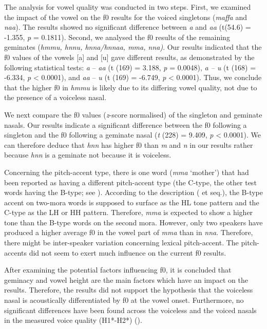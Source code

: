 \documentclass[output=paper]{langscibook}
\begin{document}
The analysis for vowel quality was conducted in two steps. First, we examined the impact of the vowel on the f0 results for the voiced singletons (\textit{maffa} and \textit{naa}). The results showed no significant difference between \textit{a} and \textit{aa} (t(54.6) = -1.355, \textit{p} = 0.1811). Second, we analysed the f0 results of the remaining geminates (\textit{hmmu, hnnu, hnna/hnnaa, mma, nna)}. Our results indicated that the f0 values of the vowels [a] and [u] gave different results, as demonstrated by the following statistical tests: \textit{a} -- \textit{aa} (t (169) = 3.188, \textit{p} = 0.0048), \textit{a -- u} (t (168) = -6.334, \textit{p} < 0.0001), and \textit{aa} -- \textit{u} (t (169) = -6.749, \textit{p} < 0.0001). Thus, we conclude that the higher f0 in \textit{hmmu} is likely due to its differing vowel quality, not due to the presence of a voiceless nasal.

We next compare the f0 values (\textit{z}-score normalised) of the singleton and geminate nasals. Our results indicate a significant difference between the f0 following a singleton and the f0 following a geminate nasal (\textit{t} (228) = 9.409, \textit{p} < 0.0001). We can therefore deduce that \textit{hnn} has higher f0 than \textit{m} and \textit{n} in our results rather because \textit{hnn} is a geminate not because it is voiceless.

Concerning the pitch-accent type, there is one word (\textit{mma} ‘mother’) that had been reported as having a different pitch-accent type (the C-type, the other test words having the B-type; see ). According to the description (\citealt{IgarashiEtAl2011} et seq.), the B-type accent on two-mora words is supposed to surface as the HL tone pattern and the C-type as the LH or HH pattern. Therefore, \textit{mma} is expected to show a higher tone than the B-type words on the second mora. However, only two speakers have produced a higher average f0 in the vowel part of \textit{mma} than in \textit{nna}. Therefore, there might be inter-speaker variation concerning lexical pitch-accent. The pitch-accents did not seem to exert much influence on the current f0 results.

After examining the potential factors influencing f0, it is concluded that geminacy and vowel height are the main factors which have an impact on the results. Therefore, the results did not support the hypothesis that the voiceless nasal is acoustically differentiated by f0 at the vowel onset. Furthermore, no significant differences have been found across the voiceless and the voiced nasals in the measured voice quality (H1*-H2*) (). 
\end{document}
